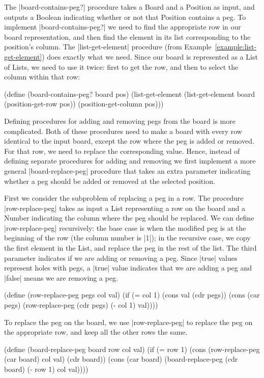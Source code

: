 \begin{schemeregion}
{The \scheme|board-contains-peg?| procedure takes a Board and a Position as input, and outputs a Boolean indicating whether or not that Position contains a peg.   To implement \scheme|board-contains-peg?| we need to find the appropriate row in our board representation, and then find the element in its list corresponding to the position's column.  The \scheme|list-get-element| procedure (from Example~\ref{example:list-get-element}) does exactly what we need.  Since our board is represented as a List of Lists, we need to use it twice: first to get the row, and then to select the column within that row:
\begin{schemedisplay}
(define (board-contains-peg? board pos)
  (list-get-element (list-get-element board (position-get-row pos)) 
                    (position-get-column pos)))
\end{schemedisplay}
Defining procedures for adding and removing pegs from the board is more complicated.  Both of these procedures need to make a board with every row identical to the input board, except the row where the peg is added or removed.  For that row, we need to replace the corresponding value.  Hence, instead of defining separate procedures for adding and removing we first implement a more general \scheme|board-replace-peg| procedure that takes an extra parameter indicating whether a peg should be added or removed at the selected position.

First we consider the subproblem of replacing a peg in a row.  The procedure \scheme|row-replace-peg| takes as input a List representing a row on the board and a Number indicating the column where the peg should be replaced.  We can define \scheme|row-replace-peg| recursively: the base case is when the modified peg is at the beginning of the row (the column number is \scheme|1|); in the recursive case, we copy the first element in the List, and replace the peg in the rest of the list.  The third parameter indicates if we are adding or removing a peg.  Since \scheme|true| values represent holes with pegs, a \scheme|true| value indicates that we are adding a peg and \scheme|false| means we are removing a peg.
\begin{schemedisplay}
(define (row-replace-peg pegs col val)
  (if (= col 1) 
      (cons val (cdr pegs))
      (cons (car pegs) (row-replace-peg (cdr pegs) (- col 1) val))))
\end{schemedisplay}

To replace the peg on the board, we use \scheme|row-replace-peg| to replace the peg on the appropriate row, and keep all the other rows the same.  
\begin{schemedisplay}
(define (board-replace-peg board row col val)
  (if (= row 1) 
      (cons (row-replace-peg (car board) col val) (cdr board))
      (cons (car board) (board-replace-peg (cdr board) (- row 1) col val))))
\end{schemedisplay}

}
\end{schemeregion}
